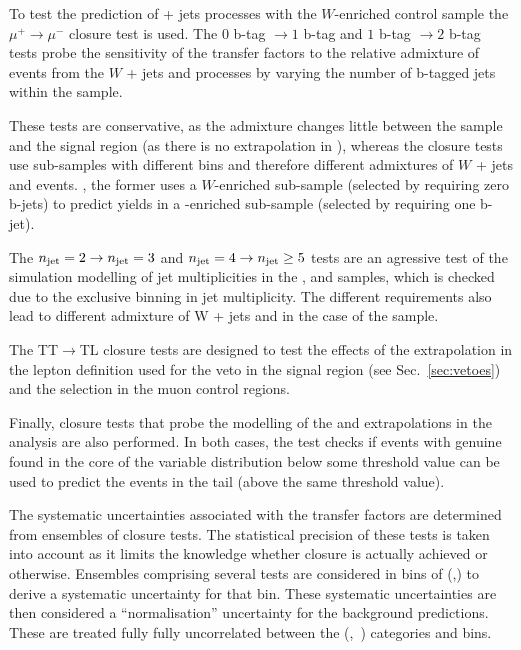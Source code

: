 To test the prediction of \znunu + jets processes with the $W$-enriched \mj control sample
the $\mu^{+}\rightarrow\mu^{-}$ closure test is used. The $0$ b-tag $\rightarrow1$ b-tag and $1$ b-tag $\rightarrow2$ b-tag
tests probe the sensitivity of the transfer factors to the relative admixture of events from the $W$ + jets and \ttbar processes by
varying the number of b-tagged jets within the \mj sample. 

These tests are conservative, as the admixture changes little between the \mj sample and the signal region 
(as there is no extrapolation in \nb), whereas the closure tests use sub-samples with different \nb bins and
therefore different admixtures of $W$ + jets and \ttbar events. \eg, the former uses a $W$-enriched sub-sample (selected by requiring zero
b-jets) to predict yields in a \ttbar-enriched sub-sample (selected by requiring one b-jet).

The $n_{\text{jet}}=2\rightarrow n_{\text{jet}}=3$ and $n_{\text{jet}}=4\rightarrow n_{\text{jet}}\geq5$ tests are an agressive test of the simulation modelling of jet
multiplicities in the \mj, \mmj and \gj samples, which is checked due to the exclusive binning in jet multiplicity. The different \njet
requirements also lead to different admixture of W + jets and \ttbar in the case of the \mj sample.

The TT$\rightarrow$TL closure tests are designed to test the effects of the extrapolation in the
 lepton definition used for the veto in the signal region (see Sec.~\ref{sec:vetoes}) and the selection in the
muon control regions. 

Finally, closure tests that probe the modelling of the \alphat and \bdphi extrapolations in the analysis are also performed. 
In both cases, the test checks if events with genuine \met found in the core of the variable distribution below some 
threshold value can be used to predict the events in the tail (above the same threshold value). 


The systematic uncertainties associated with the transfer factors are determined from ensembles of closure
tests. The statistical precision of these tests is taken into account as it limits the knowledge whether closure is actually achieved or otherwise. 
Ensembles comprising several tests are considered in bins of (\njet,\scalht) to derive a systematic uncertainty for that bin. These systematic uncertainties are then considered a ``normalisation'' uncertainty for the background predictions. These are treated fully fully uncorrelated between the (\njet,~\nb)
categories and \scalht bins. 


